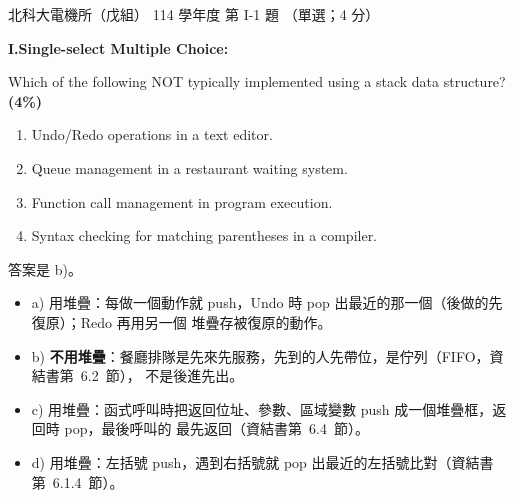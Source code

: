 \begin{pastexam}[label={px:ntut-114-ee-ds-01}]{北科大電機所（戊組） 114 學年度 第 I-1 題}
（單選；4 分）

\textbf{I.\quad Single-select Multiple Choice:}

Which of the following NOT typically implemented using a stack data structure? \textbf{(4\%)}
\begin{enumerate}[label=\alph*)]
\item Undo/Redo operations in a text editor.
\item Queue management in a restaurant waiting system.
\item Function call management in program execution.
\item Syntax checking for matching parentheses in a compiler.
\end{enumerate}
\end{pastexam}

\begin{pastsoln}
答案是 b)。

\begin{itemize}
\item a) 用堆疊：每做一個動作就 push，Undo 時 pop 出最近的那一個（後做的先復原）；Redo 再用另一個
堆疊存被復原的動作。
\item b) \textbf{不用堆疊}：餐廳排隊是先來先服務，先到的人先帶位，是佇列（FIFO，資結書第~6.2~節），
不是後進先出。
\item c) 用堆疊：函式呼叫時把返回位址、參數、區域變數 push 成一個堆疊框，返回時 pop，最後呼叫的
最先返回（資結書第~6.4~節）。
\item d) 用堆疊：左括號 push，遇到右括號就 pop 出最近的左括號比對（資結書第~6.1.4~節）。
\end{itemize}
\end{pastsoln}
